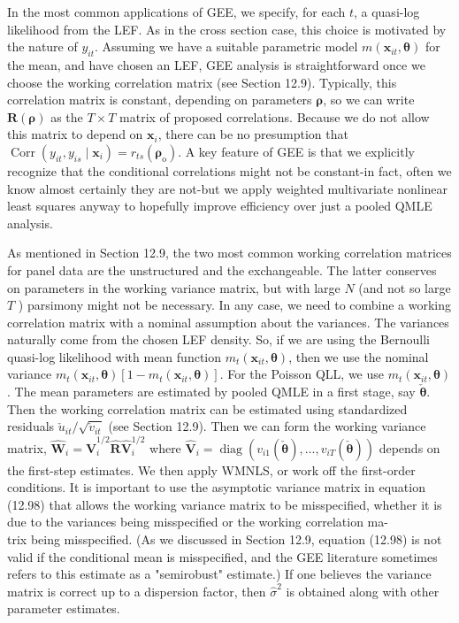 \documentclass[10pt]{article}
\begin{document}
In the most common applications of GEE, we specify, for each $t$, a quasi-log likelihood from the LEF. As in the cross section case, this choice is motivated by the nature of $y_{i t}$. Assuming we have a suitable parametric model $m\left(\mathbf{x}_{i t}, \boldsymbol{\theta}\right)$ for the mean, and have chosen an LEF, GEE analysis is straightforward once we choose the working correlation matrix (see Section 12.9). Typically, this correlation matrix is constant, depending on parameters $\boldsymbol{\rho}$, so we can write $\mathbf{R}(\boldsymbol{\rho})$ as the $T \times T$ matrix of proposed correlations. Because we do not allow this matrix to depend on $\mathbf{x}_{i}$, there can be no presumption that $\operatorname{Corr}\left(y_{i t}, y_{i s} \mid \mathbf{x}_{i}\right)=r_{t s}\left(\boldsymbol{\rho}_{\mathrm{o}}\right)$. A key feature of GEE is that we explicitly recognize that the conditional correlations might not be constant-in fact, often we know almost certainly they are not-but we apply weighted multivariate nonlinear least squares anyway to hopefully improve efficiency over just a pooled QMLE analysis.

As mentioned in Section 12.9, the two most common working correlation matrices for panel data are the unstructured and the exchangeable. The latter conserves on parameters in the working variance matrix, but with large $N$ (and not so large $T$ ) parsimony might not be necessary. In any case, we need to combine a working correlation matrix with a nominal assumption about the variances. The variances naturally come from the chosen LEF density. So, if we are using the Bernoulli quasi-log likelihood with mean function $m_{t}\left(\mathbf{x}_{i t}, \boldsymbol{\theta}\right)$, then we use the nominal variance $m_{t}\left(\mathbf{x}_{i t}, \boldsymbol{\theta}\right)\left[1-m_{t}\left(\mathbf{x}_{i t}, \boldsymbol{\theta}\right)\right]$. For the Poisson QLL, we use $m_{t}\left(\mathbf{x}_{i t}, \boldsymbol{\theta}\right)$. The mean parameters are estimated by pooled QMLE in a first stage, say $\check{\boldsymbol{\theta}}$. Then the working correlation matrix can be estimated using standardized residuals $\check{u}_{i t} / \sqrt{\check{v}_{i t}}$ (see Section 12.9). Then we can form the working variance matrix, $\hat{\mathbf{W}}_{i}=\hat{\mathbf{V}}_{i}^{1 / 2} \hat{\mathbf{R}} \hat{\mathbf{V}}_{i}^{1 / 2}$ where $\hat{\mathbf{V}}_{i}= \operatorname{diag}\left(v_{i 1}(\check{\boldsymbol{\theta}}), \ldots, v_{i T}(\check{\boldsymbol{\theta}})\right)$ depends on the first-step estimates. We then apply WMNLS, or work off the first-order conditions. It is important to use the asymptotic variance matrix in equation (12.98) that allows the working variance matrix to be misspecified, whether it is due to the variances being misspecified or the working correlation ma-\\
trix being misspecified. (As we discussed in Section 12.9, equation (12.98) is not valid if the conditional mean is misspecified, and the GEE literature sometimes refers to this estimate as a "semirobust" estimate.) If one believes the variance matrix is correct up to a dispersion factor, then $\hat{\sigma}^{2}$ is obtained along with other parameter estimates.
\end{document}
